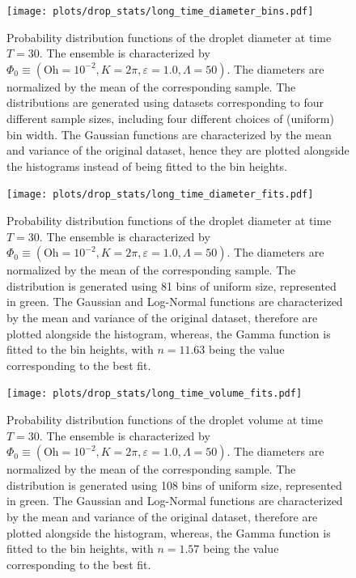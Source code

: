 


\begin{figure}
\centering
\texttt{[image: plots/drop\_stats/long\_time\_diameter\_bins.pdf]}
\caption{Probability distribution functions of the droplet diameter at time $T = 30$. 
	The ensemble is characterized by $\Phi_0 \equiv \left( \textrm{Oh} = 10^{-2}, K = 2\pi , \varepsilon = 1.0 , \Lambda = 50 \right)$. 
The diameters are normalized by the mean of the corresponding sample.  
The distributions are generated using datasets corresponding to four different sample sizes, 
including four different choices of (uniform) bin width. 
The Gaussian functions are characterized by the mean and variance of the original dataset, 
hence they are plotted alongside the histograms instead of being fitted to the bin heights.
	}
\label{t2_dia_bins}
\end{figure}



\begin{figure}
\centering
\texttt{[image: plots/drop\_stats/long\_time\_diameter\_fits.pdf]}
\caption{Probability distribution functions of the droplet diameter at time $T = 30$. 
	The ensemble is characterized by $\Phi_0 \equiv \left( \textrm{Oh} = 10^{-2}, K = 2\pi , \varepsilon = 1.0 , \Lambda = 50 \right)$. 
The diameters are normalized by the mean of the corresponding sample.  
The distribution is generated using 81 bins of uniform size, represented in green.  
The Gaussian and Log-Normal functions are characterized by the mean and variance of the original dataset, 
therefore are plotted alongside the histogram, whereas, the Gamma function is fitted to the bin heights,
with $n= 11.63$ being the value corresponding to the best fit.
	}
\label{t2_dia_fits}
\end{figure}

\begin{figure}
\centering
\texttt{[image: plots/drop\_stats/long\_time\_volume\_fits.pdf]}
\caption{Probability distribution functions of the droplet volume at time $T = 30$. 
	The ensemble is characterized by $\Phi_0 \equiv \left( \textrm{Oh} = 10^{-2}, K = 2\pi , \varepsilon = 1.0 , \Lambda = 50 \right)$. 
The diameters are normalized by the mean of the corresponding sample.  
The distribution is generated using 108 bins of uniform size, represented in green.  
The Gaussian and Log-Normal functions are characterized by the mean and variance of the original dataset, 
therefore are plotted alongside the histogram, whereas, the Gamma function is fitted to the bin heights,
with $n= 1.57$ being the value corresponding to the best fit.
	}
\label{t2_vol_fits}
\end{figure}

